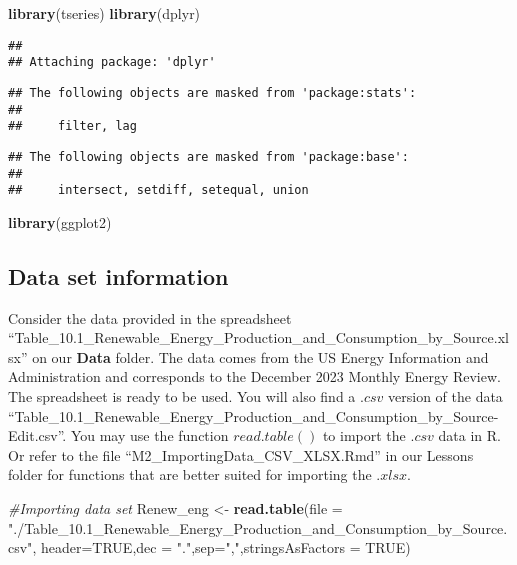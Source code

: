 \documentclass[
]{article}
\newenvironment{Shaded}{\begin{snugshade}}{\end{snugshade}}
\newcommand{\AttributeTok}[1]{\textcolor[rgb]{0.13,0.29,0.53}{#1}}
\newcommand{\CommentTok}[1]{\textcolor[rgb]{0.56,0.35,0.01}{\textit{#1}}}
\newcommand{\ConstantTok}[1]{\textcolor[rgb]{0.56,0.35,0.01}{#1}}
\newcommand{\FunctionTok}[1]{\textcolor[rgb]{0.13,0.29,0.53}{\textbf{#1}}}
\newcommand{\NormalTok}[1]{#1}
\newcommand{\OtherTok}[1]{\textcolor[rgb]{0.56,0.35,0.01}{#1}}
\newcommand{\StringTok}[1]{\textcolor[rgb]{0.31,0.60,0.02}{#1}}
\begin{document}
\begin{Shaded}
\begin{Highlighting}[]
\FunctionTok{library}\NormalTok{(tseries)}
\FunctionTok{library}\NormalTok{(dplyr)}
\end{Highlighting}
\end{Shaded}

\begin{verbatim}
## 
## Attaching package: 'dplyr'
\end{verbatim}

\begin{verbatim}
## The following objects are masked from 'package:stats':
## 
##     filter, lag
\end{verbatim}

\begin{verbatim}
## The following objects are masked from 'package:base':
## 
##     intersect, setdiff, setequal, union
\end{verbatim}

\begin{Shaded}
\begin{Highlighting}[]
\FunctionTok{library}\NormalTok{(ggplot2)}
\end{Highlighting}
\end{Shaded}

\hypertarget{data-set-information}{%
\subsection{Data set information}\label{data-set-information}}

Consider the data provided in the spreadsheet
``Table\_10.1\_Renewable\_Energy\_Production\_and\_Consumption\_by\_Source.xlsx''
on our \textbf{Data} folder. The data comes from the US Energy
Information and Administration and corresponds to the December 2023
Monthly Energy Review. The spreadsheet is ready to be used. You will
also find a \(.csv\) version of the data
``Table\_10.1\_Renewable\_Energy\_Production\_and\_Consumption\_by\_Source-Edit.csv''.
You may use the function \(read.table()\) to import the \(.csv\) data in
R. Or refer to the file ``M2\_ImportingData\_CSV\_XLSX.Rmd'' in our
Lessons folder for functions that are better suited for importing the
\(.xlsx\).

\begin{Shaded}
\begin{Highlighting}[]
\CommentTok{\#Importing data set}
\NormalTok{Renew\_eng }\OtherTok{\textless{}{-}} \FunctionTok{read.table}\NormalTok{(}\AttributeTok{file =} \StringTok{"./Table\_10.1\_Renewable\_Energy\_Production\_and\_Consumption\_by\_Source.csv"}\NormalTok{, }\AttributeTok{header=}\ConstantTok{TRUE}\NormalTok{,}\AttributeTok{dec =} \StringTok{"."}\NormalTok{,}\AttributeTok{sep=}\StringTok{","}\NormalTok{,}\AttributeTok{stringsAsFactors =} \ConstantTok{TRUE}\NormalTok{)}
\end{Highlighting}
\end{Shaded}
\end{document}
